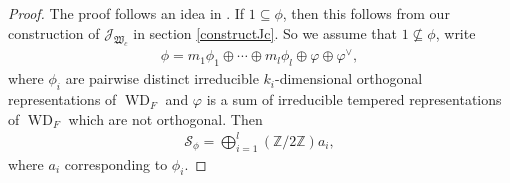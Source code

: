 \documentclass[article]{article}
\numberwithin{equation}{section}
\theoremstyle{definition}
\DeclareMathOperator{\WD}{WD}
\begin{document}
\begin{proof}
 The proof follows an idea in \cite{MR3788848}. If $1\subseteq \phi$, then this follows from our construction of $\mathcal J_{\mathfrak W_{c}}$ in section \ref{constructJc}. So we assume that $1\not\subseteq \phi$, write 
 \begin{align*}
 \phi=m_1\phi_1\oplus \cdots \oplus m_l \phi_l\oplus \varphi\oplus \varphi^\vee,
 \end{align*}
 where $\phi_i$ are pairwise distinct irreducible $k_i$-dimensional orthogonal representations of $\WD_{F}$ and $\varphi$ is a sum of irreducible tempered representations of $\WD_F$ which are not orthogonal. Then  
 \begin{align*}
 \mathcal {S}_{\phi}=\bigoplus_{i=1}^l (\mathbb Z/2\mathbb Z)a_i,
 \end{align*} 
 where $a_i$ corresponding to $\phi_i$.
 

\end{proof}
\end{document}
